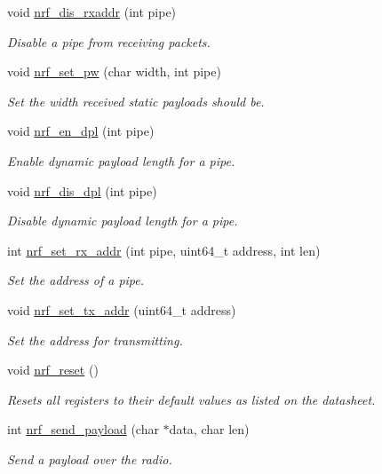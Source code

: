 \begin{DoxyCompactItemize}
void \hyperlink{group___user_func_gaf813fcdbfd3df6f8b89aa1848adce5f2}{nrf\+\_\+dis\+\_\+rxaddr} (int pipe)
\begin{DoxyCompactList}\small\item\em Disable a pipe from receiving packets. \end{DoxyCompactList}\item 
void \hyperlink{group___user_func_ga501ef571a9262e1dc5c3b7b1abcf76d9}{nrf\+\_\+set\+\_\+pw} (char width, int pipe)
\begin{DoxyCompactList}\small\item\em Set the width received static payloads should be. \end{DoxyCompactList}\item 
void \hyperlink{group___user_func_ga58dfdd90a3f6ad785a3ec57ea18a6106}{nrf\+\_\+en\+\_\+dpl} (int pipe)
\begin{DoxyCompactList}\small\item\em Enable dynamic payload length for a pipe. \end{DoxyCompactList}\item 
void \hyperlink{group___user_func_ga08f7c4fbf94b3e5b69d1e5a143853e8a}{nrf\+\_\+dis\+\_\+dpl} (int pipe)
\begin{DoxyCompactList}\small\item\em Disable dynamic payload length for a pipe. \end{DoxyCompactList}\item 
int \hyperlink{group___user_func_ga713e1f78e3468d2c82c9d98e357a5f79}{nrf\+\_\+set\+\_\+rx\+\_\+addr} (int pipe, uint64\+\_\+t address, int len)
\begin{DoxyCompactList}\small\item\em Set the address of a pipe. \end{DoxyCompactList}\item 
void \hyperlink{group___user_func_ga7cb014d392432800319725fc5fedc3c5}{nrf\+\_\+set\+\_\+tx\+\_\+addr} (uint64\+\_\+t address)
\begin{DoxyCompactList}\small\item\em Set the address for transmitting. \end{DoxyCompactList}\item 
void \hyperlink{group___user_func_gafa306c7ac8a44ea0e39287b3f18ec68a}{nrf\+\_\+reset} ()
\begin{DoxyCompactList}\small\item\em Resets all registers to their default values as listed on the datasheet. \end{DoxyCompactList}\item 
int \hyperlink{group___user_func_gaa82cc1119eb71ba500cc2c55ca312eb2}{nrf\+\_\+send\+\_\+payload} (char $\ast$data, char len)
\begin{DoxyCompactList}\small\item\em Send a payload over the radio. \end{DoxyCompactList}\end{DoxyCompactItemize}


